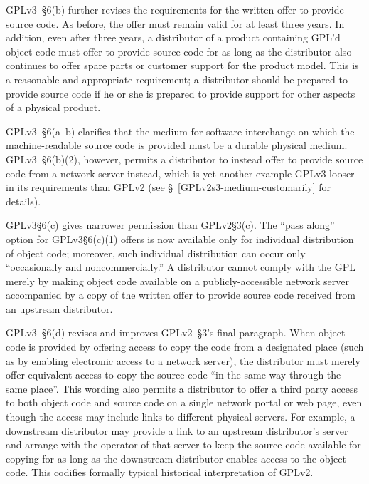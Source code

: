 
GPLv3~\S6(b) further revises the requirements for the written offer to
provide source code. As before, the offer must remain valid for at least
three years. In addition, even after three years, a distributor of a product
containing GPL'd object code must offer to provide source code for as long as
the distributor also continues to offer spare parts or customer support for
the product model.  This is a reasonable and appropriate requirement; a
distributor should be prepared to provide source code if he or she is
prepared to provide support for other aspects of a physical product.

GPLv3~\S6(a--b) clarifies that the medium for software interchange on which
the machine-readable source code is provided must be a durable physical
medium.  GPLv3~\S6(b)(2), however, permits a distributor to instead offer to
provide source code from a network server instead, which is yet another
example GPLv3 looser in its requirements than GPLv2 (see
\S~\ref{GPLv2s3-medium-customarily} for details).


GPLv3\S6(c) gives narrower permission than GPLv2\S3(c).  The ``pass along''
option for GPLv3\S6(c)(1) offers is now available only for individual
distribution of object code; moreover, such individual distribution can occur
only ``occasionally and noncommercially.''  A distributor cannot comply with
the GPL merely by making object code available on a publicly-accessible
network server accompanied by a copy of the written offer to provide source
code received from an upstream distributor.


GPLv3~\S6(d) revises and improves GPLv2~\S3's final paragraph.  When object
code is provided by offering access to copy the code from a designated place
(such as by enabling electronic access to a network server), the distributor
must merely offer equivalent access to copy the source code ``in the same way
through the same place''.  This wording also permits a distributor to offer a
third party access to both object code and source code on a single network
portal or web page, even though the access may include links to different
physical servers.  For example, a downstream distributor may provide a link
to an upstream distributor's server and arrange with the operator of that
server to keep the source code available for copying for as long as the
downstream distributor enables access to the object code.  This codifies
formally typical historical interpretation of GPLv2.

